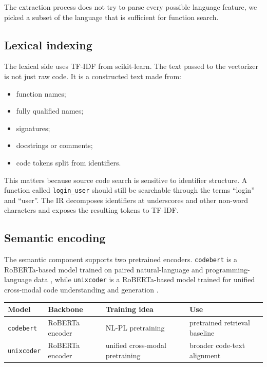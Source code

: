 \documentclass[12pt]{article}
\begin{document}
The extraction process does not try to parse every possible language feature, we picked a subset of the language that is sufficient for function search.

\subsection{Lexical indexing}
\label{subsec:tfidf}

The lexical side uses TF-IDF from scikit-learn. The text passed to the vectorizer is not just raw code. It is a constructed text made from:

\begin{itemize}
  \item function names;
  \item fully qualified names;
  \item signatures;
  \item docstrings or comments;
  \item code tokens split from identifiers.
\end{itemize}

This matters because source code search is sensitive to identifier structure.
A function called \texttt{login\_user} should still be searchable through the terms ``login'' and ``user''.
The IR decomposes identifiers at underscores and other non-word characters and exposes the resulting tokens to TF-IDF.

\subsection{Semantic encoding}
\label{subsec:semantic}

The semantic component supports two pretrained encoders.
\texttt{codebert} is a RoBERTa-based model trained on paired natural-language and programming-language data \cite{feng2020codebertpretrainedmodelprogramming},
while \texttt{unixcoder} is a RoBERTa-based model trained for unified cross-modal code understanding and generation \cite{guo2022unixcoderunifiedcrossmodalpretraining}.

\begin{center}
  \small
  \setlength{\tabcolsep}{4pt}
  \begin{tabularx}{\linewidth}{>{\raggedright\arraybackslash}p{1.0in} >{\raggedright\arraybackslash}X >{\raggedright\arraybackslash}X >{\raggedright\arraybackslash}X}
    \toprule
    Model & Backbone & Training idea & Use \\
    \midrule
    \texttt{codebert} & RoBERTa encoder & NL-PL pretraining & pretrained retrieval baseline \\
    \texttt{unixcoder} & RoBERTa encoder & unified cross-modal pretraining & broader code-text alignment \\
    \bottomrule
  \end{tabularx}
  \normalsize
\end{center}
\end{document}
